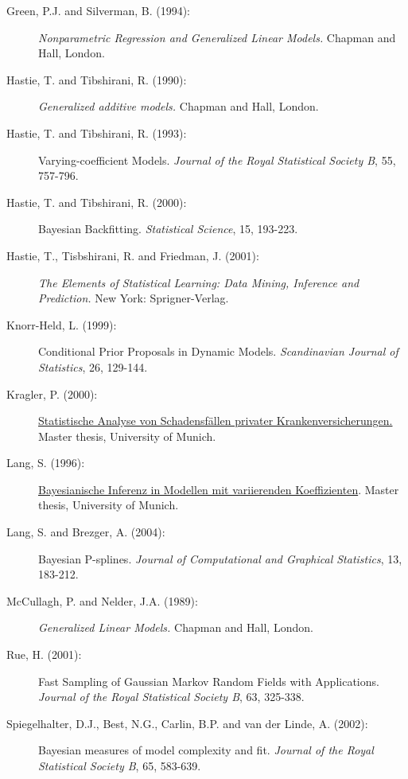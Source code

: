 \begin{description}
\item[Green, P.J. and Silverman, B. (1994):] {\em Nonparametric Regression and Generalized Linear Models.} Chapman
and Hall, London.

\item[Hastie, T. and Tibshirani, R. (1990):] {\em Generalized additive models.} Chapman and
Hall, London.

\item[Hastie, T. and Tibshirani, R. (1993):] Varying-coefficient Models.
{\em Journal of the Royal Statistical Society B}, 55, 757-796.

\item[Hastie, T. and Tibshirani, R. (2000):] Bayesian Backfitting. {\em Statistical Science}, 15, 193-223.

\item[Hastie, T., Tisbshirani, R. and Friedman, J. (2001):] {\em The Elements of Statistical Learning: Data Mining,
Inference and Prediction.} New York: Sprigner-Verlag.

\item[Knorr-Held, L. (1999):]
Conditional Prior Proposals in Dynamic Models. {\em Scandinavian
Journal of Statistics}, 26, 129-144.

\item[Kragler, P. (2000):] \href{http://www.scor.fr/us/2_laureat.asp?pays=2}
{Statistische Analyse von Schadensf\"allen privater
Krankenversicherungen.} Master thesis, University of Munich.


\item[Lang, S. (1996):]
\href{mailto:lang@stat.uni-muenchen.de} {Bayesianische Inferenz in
Modellen mit variierenden Koeffizienten}. Master thesis, University of Munich.


\item[Lang, S. and Brezger, A. (2004):]
Bayesian P-splines. {\em Journal of Computational and Graphical Statistics}, 13, 183-212.

\item[McCullagh, P. and Nelder, J.A. (1989):] {\em Generalized Linear Models.} Chapman and Hall, London.

\item[Rue, H. (2001):] Fast Sampling of Gaussian Markov Random Fields with Applications.
{\em Journal of the Royal Statistical Society B}, 63, 325-338.

\item[Spiegelhalter, D.J., Best, N.G., Carlin, B.P. and van der Linde, A. (2002):]
Bayesian measures of model complexity and fit. {\em Journal of the
Royal Statistical Society B}, 65, 583-639.

\end{description}
